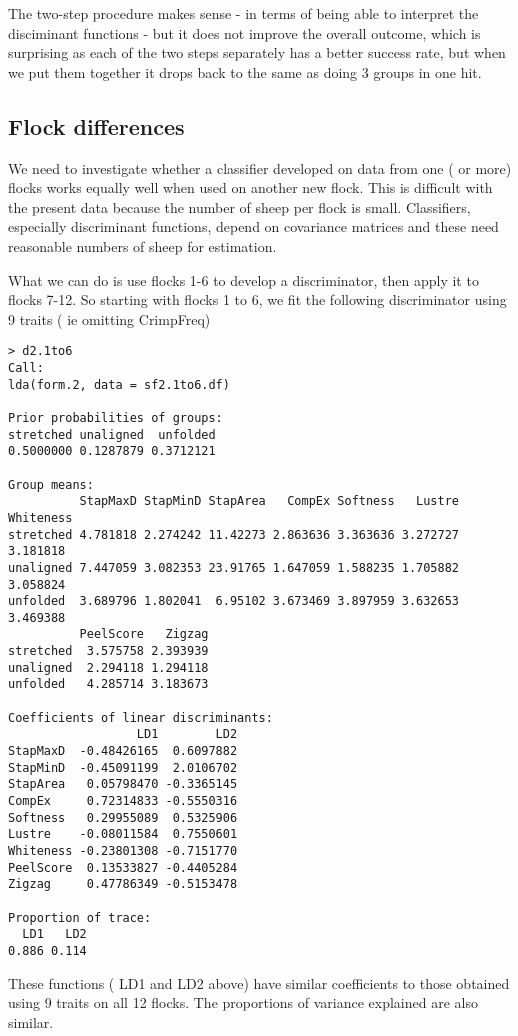 \documentclass[titlepage]{article}  %
\begin{document}
The two-step procedure makes sense - in terms of being able to interpret the disciminant functions - but it does not improve the overall outcome, which is surprising as each of the two steps separately has a better success rate, but when we put them together it drops back to the same as doing 3 groups in one hit.


\subsection{Flock differences}
We need to investigate whether a classifier developed on data from one ( or more) flocks works equally well when used on another new flock. This is difficult with the present data because the number of sheep per flock is small. Classifiers, especially discriminant functions, depend on covariance matrices and these need reasonable numbers of sheep for estimation.

What we can do is use flocks 1-6 to develop a discriminator, then apply it to flocks 7-12. So starting with flocks 1 to 6, we fit the following discriminator using 9 traits ( ie omitting CrimpFreq)
\begin{verbatim}
> d2.1to6
Call:
lda(form.2, data = sf2.1to6.df)

Prior probabilities of groups:
stretched unaligned  unfolded 
0.5000000 0.1287879 0.3712121 

Group means:
          StapMaxD StapMinD StapArea   CompEx Softness   Lustre Whiteness
stretched 4.781818 2.274242 11.42273 2.863636 3.363636 3.272727  3.181818
unaligned 7.447059 3.082353 23.91765 1.647059 1.588235 1.705882  3.058824
unfolded  3.689796 1.802041  6.95102 3.673469 3.897959 3.632653  3.469388
          PeelScore   Zigzag
stretched  3.575758 2.393939
unaligned  2.294118 1.294118
unfolded   4.285714 3.183673

Coefficients of linear discriminants:
                  LD1        LD2
StapMaxD  -0.48426165  0.6097882
StapMinD  -0.45091199  2.0106702
StapArea   0.05798470 -0.3365145
CompEx     0.72314833 -0.5550316
Softness   0.29955089  0.5325906
Lustre    -0.08011584  0.7550601
Whiteness -0.23801308 -0.7151770
PeelScore  0.13533827 -0.4405284
Zigzag     0.47786349 -0.5153478

Proportion of trace:
  LD1   LD2 
0.886 0.114 
\end{verbatim}
 These functions ( LD1 and LD2 above) have similar coefficients to those obtained using 9 traits on all 12 flocks. The proportions of variance explained are also similar.
\end{document}
